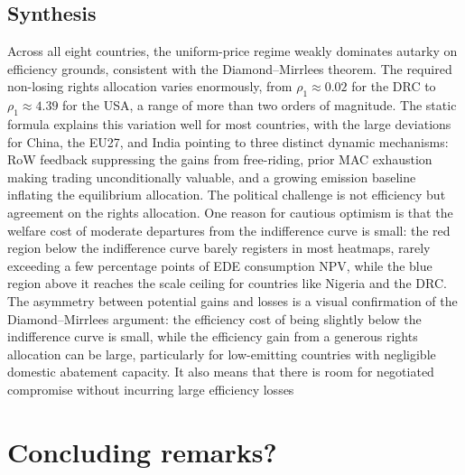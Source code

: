 \documentclass[12pt,english]{article}
\begin{document}
\subsection{Synthesis}
Across all eight countries, the uniform-price regime weakly dominates autarky on efficiency grounds, consistent with the Diamond--Mirrlees theorem. The required non-losing rights allocation varies enormously, from $\rho_1 \approx 0.02$ for the DRC to $\rho_1 \approx 4.39$ for the USA, a range of more than two orders of magnitude. The static formula explains this variation well for most countries, with the large deviations for China, the EU27, and India pointing to three distinct dynamic mechanisms: RoW feedback suppressing the gains from free-riding, prior MAC exhaustion making trading unconditionally valuable, and a growing emission baseline inflating the equilibrium allocation. The political challenge is not efficiency but agreement on the rights allocation. One reason for cautious optimism is that the welfare cost of moderate departures from the indifference curve is small: the red region below the indifference curve barely registers in most heatmaps, rarely exceeding a few percentage points of EDE consumption NPV, while the blue region above it reaches the scale ceiling for countries like Nigeria and the DRC. The asymmetry between potential gains and losses is a visual confirmation of the Diamond--Mirrlees argument: the efficiency cost of being slightly below the indifference curve is small, while the efficiency gain from a generous rights allocation can be large, particularly for low-emitting countries with negligible domestic abatement capacity. It also means that there is room for negotiated compromise without incurring large efficiency losses

\section{Concluding remarks?}




\end{document}
